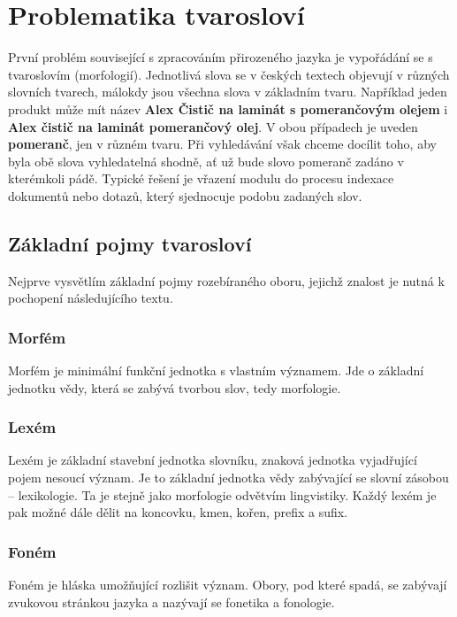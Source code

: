 \documentclass[FM,DP]{tulthesis}
\begin{document}
\section{Problematika tvarosloví}

První problém související s zpracováním přirozeného jazyka je vypořádání se s tvaroslovím
(morfologií). Jednotlivá slova se v českých textech objevují v různých slovních tvarech, 
málokdy jsou všechna slova v základním tvaru. Například jeden produkt může mít název
\textbf{Alex Čistič na laminát s pomerančovým olejem} i \textbf{Alex čistič na laminát pomerančový olej}.
V obou případech je uveden \textbf{pomeranč}, jen v různém tvaru. Při vyhledávání však
chceme docílit toho, aby byla obě slova vyhledatelná shodně, ať už bude slovo pomeranč
zadáno v kterémkoli pádě. Typické řešení je vřazení modulu do procesu indexace dokumentů nebo 
dotazů, který sjednocuje podobu zadaných slov.

\subsection{Základní pojmy tvarosloví}

Nejprve vysvětlím základní pojmy rozebíraného oboru, jejichž znalost je nutná k pochopení 
následujícího textu.

\subsubsection*{Morfém}

Morfém je minimální funkční jednotka s vlastním významem. Jde o základní jednotku vědy, 
která se zabývá tvorbou slov, tedy morfologie.

\subsubsection*{Lexém}

Lexém je základní stavební jednotka slovníku, znaková jednotka vyjadřující pojem nesoucí
význam. Je to základní jednotka vědy zabývající se slovní zásobou -- lexikologie. Ta je stejně 
jako morfologie odvětvím lingvistiky. Každý lexém je pak možné dále dělit na koncovku, 
kmen, kořen, prefix a sufix.

\subsubsection*{Foném}

Foném je hláska umožňující rozlišit význam. Obory, pod které spadá, se zabývají zvukovou
stránkou jazyka a nazývají se fonetika a fonologie.
\end{document}
